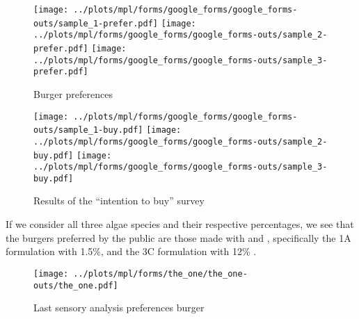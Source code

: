 \begin{figure}[H]
\centering
	\subcaptionbox%
	{\label{subfig:burger_prefs-palmata}}%
		{\texttt{[image: ../plots/mpl/forms/google\_forms/google\_forms-outs/sample\_1-prefer.pdf]}}%
\hspace*{\trehbtwsfig}%
	\subcaptionbox%
	{\label{subfig:burger_prefs-spirulina}}%
		{\texttt{[image: ../plots/mpl/forms/google\_forms/google\_forms-outs/sample\_2-prefer.pdf]}}%
\hspace*{\trehbtwsfig}%
	\subcaptionbox%
	{\label{subfig:burger_prefs-chlorella}}%
		{\texttt{[image: ../plots/mpl/forms/google\_forms/google\_forms-outs/sample\_3-prefer.pdf]}}%
\caption{Burger preferences}
\label{fig:burger_prefs}
\end{figure}

\begin{figure}[H]
\centering
	\subcaptionbox%
	{\label{subfig:buy_survey-palmata}}%
		{\texttt{[image: ../plots/mpl/forms/google\_forms/google\_forms-outs/sample\_1-buy.pdf]}}%
\hspace*{\trehbtwsfig}%
	\subcaptionbox%
	{\label{subfig:buy_survey-spirulina}}%
		{\texttt{[image: ../plots/mpl/forms/google\_forms/google\_forms-outs/sample\_2-buy.pdf]}}%
\hspace*{\trehbtwsfig}%
	\subcaptionbox%
	{\label{subfig:buy_survey-chlorella}}%
		{\texttt{[image: ../plots/mpl/forms/google\_forms/google\_forms-outs/sample\_3-buy.pdf]}}%
\caption{Results of the “intention to buy” survey}
\label{fig:buy_survey}
\end{figure}

If we consider all three algae species and their respective percentages, we see that the burgers preferred by the public are those made with  and , specifically the 1A formulation with \num{1.5}\%, and the 3C formulation with \num{12}\% .

\begin{figure}[H]
\centering
\texttt{[image: ../plots/mpl/forms/the\_one/the\_one-outs/the\_one.pdf]}
\caption{Last sensory analysis preferences burger}
\label{fig:last_sensory_barplot}
\end{figure}

